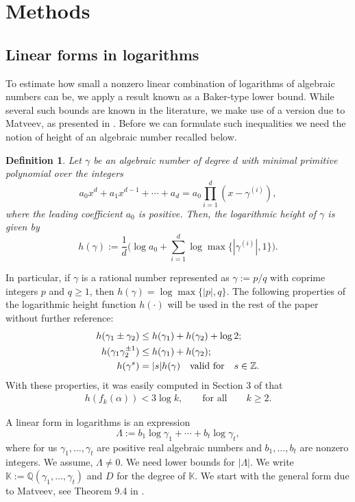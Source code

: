 \documentclass[11pt,a4paper]{article}
\newtheorem{definition}[theorem]{Definition}
\numberwithin{equation}{section}
\numberwithin{table}{section}
\numberwithin{figure}{section}
\begin{document}
\section{Methods}
\subsection{Linear forms in logarithms}
To estimate how small a nonzero linear combination of logarithms of algebraic numbers can be, we apply a result known as a Baker-type lower bound. While several such bounds are known in the literature, we make use of a version due to Matveev, as presented in \cite{matl}. Before we can formulate such inequalities we need the notion of height of an algebraic number recalled below.  


\begin{definition}
	Let $ \gamma $ be an algebraic number of degree $ d $ with minimal primitive polynomial over the integers $$ a_{0}x^{d}+a_{1}x^{d-1}+\cdots+a_{d}=a_{0}\prod_{i=1}^{d}(x-\gamma^{(i)}), $$ where the leading coefficient $ a_{0} $ is positive. Then, the logarithmic height of $ \gamma$ is given by $$ h(\gamma):= \dfrac{1}{d}\Big(\log a_{0}+\sum_{i=1}^{d}\log \max\{|\gamma^{(i)}|,1\} \Big). $$
\end{definition}
In particular, if $ \gamma$ is a rational number represented as $\gamma:=p/q$ with coprime integers $p$ and $ q\ge 1$, then $ h(\gamma ) = \log \max\{|p|, q\} $. 
The following properties of the logarithmic height function $ h(\cdot) $ will be used in the rest of the paper without further reference:
\begin{equation}\nonumber
	\begin{aligned}
		h(\gamma_{1}\pm\gamma_{2}) &\leq h(\gamma_{1})+h(\gamma_{2})+\log 2;\\
		h(\gamma_{1}\gamma_{2}^{\pm 1} ) &\leq h(\gamma_{1})+h(\gamma_{2});\\
		h(\gamma^{s}) &= |s|h(\gamma)  \quad {\text{\rm valid for}}\quad s\in \mathbb{Z}.
	\end{aligned}
\end{equation}
With these properties, it was easily computed in Section 3 of \cite{Brl} that
\begin{align}\label{eqh}
	h\left(f_k(\alpha)\right)<3\log k, \qquad \text{for all}\qquad k\ge 2.
\end{align}

A linear form in logarithms is an expression
\begin{equation*}
	\Lambda:=b_1\log \gamma_1+\cdots+b_t\log \gamma_t,
\end{equation*}
where for us $\gamma_1,\ldots,\gamma_t$ are positive real  algebraic numbers and $b_1,\ldots,b_t$ are nonzero integers. We assume, $\Lambda\ne 0$. We need lower bounds 
for $|\Lambda|$. We write ${\mathbb K}:={\mathbb Q}(\gamma_1,\ldots,\gamma_t)$ and $D$ for the degree of ${\mathbb K}$.
We start with the general form due to Matveev, see Theorem 9.4 in \cite{matl}. 
\end{document}
